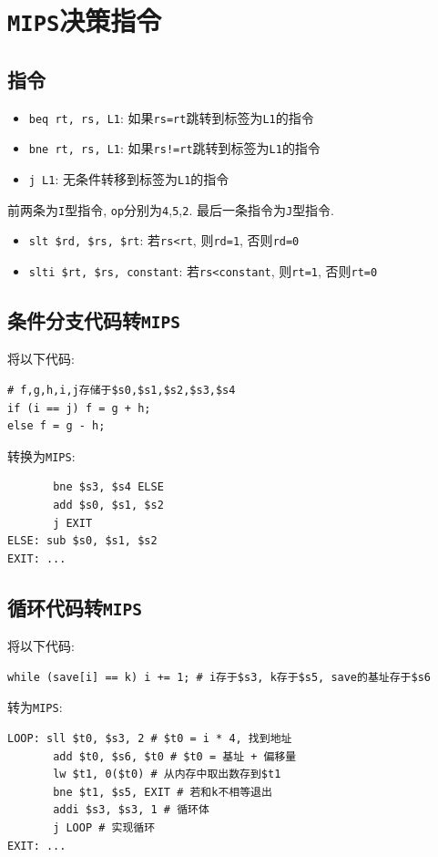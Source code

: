 \section{\texttt{MIPS}决策指令}
\subsection{指令}
\begin{itemize}
\item \verb|beq rt, rs, L1|: 如果\verb|rs=rt|跳转到标签为\verb|L1|的指令
\item \verb|bne rt, rs, L1|: 如果\verb|rs!=rt|跳转到标签为\verb|L1|的指令
\item \verb|j L1|: 无条件转移到标签为\verb|L1|的指令
\end{itemize}\par
前两条为\verb|I|型指令, \verb|op|分别为\verb|4|,\verb|5|,\verb|2|. 最后一条指令为\verb|J|型指令.\par \vspace{.5em}
\begin{itemize}
\item \verb|slt $rd, $rs, $rt|: 若\verb|rs<rt|, 则\verb|rd=1|, 否则\verb|rd=0|
\item \verb|slti $rt, $rs, constant|: 若\verb|rs<constant|, 则\verb|rt=1|, 否则\verb|rt=0|
\end{itemize}
\subsection{条件分支代码转\texttt{MIPS}}
将以下代码:
\begin{lstlisting}
# f,g,h,i,j存储于$s0,$s1,$s2,$s3,$s4
if (i == j) f = g + h;
else f = g - h;
\end{lstlisting}\par
转换为\texttt{MIPS}:
\begin{lstlisting}
       bne $s3, $s4 ELSE
       add $s0, $s1, $s2
       j EXIT
ELSE: sub $s0, $s1, $s2
EXIT: ...
\end{lstlisting}
\subsection{循环代码转\texttt{MIPS}}
将以下代码:
\begin{lstlisting}
while (save[i] == k) i += 1; # i存于$s3, k存于$s5, save的基址存于$s6
\end{lstlisting}\par
转为\texttt{MIPS}:
\begin{lstlisting}
LOOP: sll $t0, $s3, 2 # $t0 = i * 4, 找到地址
       add $t0, $s6, $t0 # $t0 = 基址 + 偏移量
       lw $t1, 0($t0) # 从内存中取出数存到$t1
       bne $t1, $s5, EXIT # 若和k不相等退出
       addi $s3, $s3, 1 # 循环体
       j LOOP # 实现循环
EXIT: ...
\end{lstlisting}
